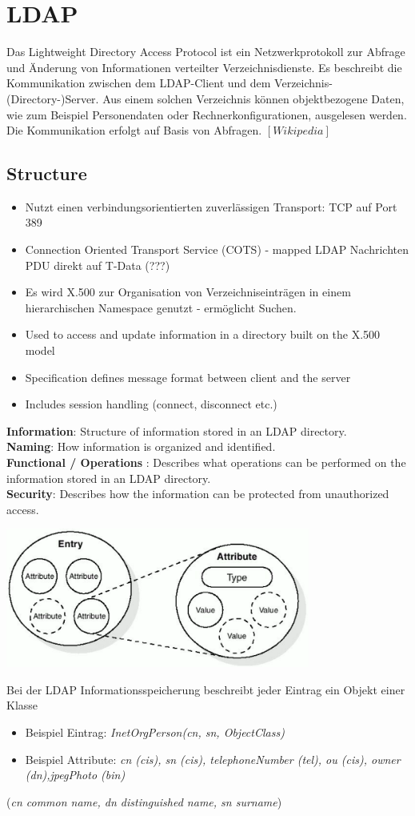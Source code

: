 \documentclass{article} %
\begin{document}
\section{LDAP}
Das Lightweight Directory Access Protocol ist ein Netzwerkprotokoll zur Abfrage und Änderung von Informationen verteilter Verzeichnisdienste.  Es beschreibt die Kommunikation zwischen dem LDAP-Client und dem Verzeichnis-(Directory-)Server. Aus einem solchen Verzeichnis können objektbezogene Daten, wie zum Beispiel Personendaten oder Rechnerkonfigurationen, ausgelesen werden. Die Kommunikation erfolgt auf Basis von Abfragen. $[Wikipedia]$
\subsection{Structure}
	\begin{itemize}
	\item Nutzt einen verbindungsorientierten zuverlässigen Transport: TCP auf Port 389
	\item Connection Oriented Transport Service (COTS) - mapped LDAP Nachrichten PDU direkt auf T-Data (???)
	\item Es wird X.500 zur Organisation von Verzeichniseinträgen in einem hierarchischen Namespace genutzt - ermöglicht Suchen.
	\item Used to access and update information in a directory built on the X.500 model 
	\item Specification defines message format between client and the server 
	\item Includes session handling (connect, disconnect etc.) 
	\end{itemize}
\noindent\textbf{Information}: Structure of information stored in an LDAP directory.\\
\noindent\textbf{Naming}: How information is organized and identified.\\
\noindent\textbf{Functional / Operations }: Describes what operations can be performed on the information stored in an LDAP directory. \\
\noindent\textbf{Security}: Describes how the information can be protected from unauthorized access.
  	\begin{center}
  		\includegraphics[width=10cm]{img/LDAPIS.png}
  	\end{center}
Bei der LDAP Informationsspeicherung beschreibt jeder Eintrag ein Objekt einer Klasse
	\begin{itemize}
	\item Beispiel Eintrag: \textit{InetOrgPerson(cn, sn, ObjectClass)}
	\item Beispiel Attribute: \textit{cn (cis), sn (cis), telephoneNumber (tel), ou (cis), owner (dn),jpegPhoto (bin) }
	\end{itemize}
(\textit{cn common name, dn distinguished name, sn surname})
\end{document}
